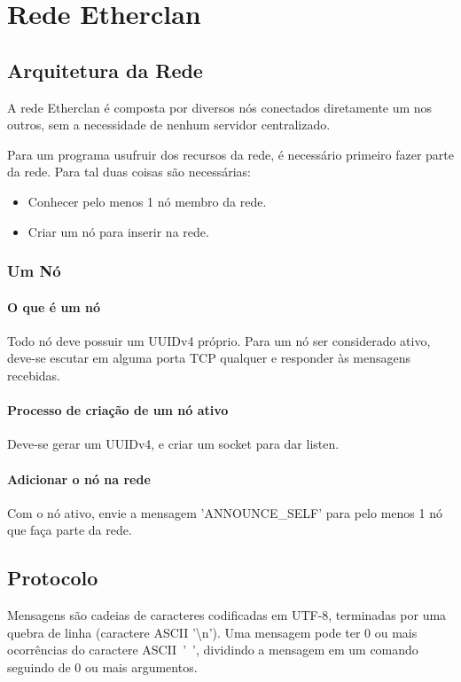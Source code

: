 \chapter{Rede Etherclan}
\label{sec:rede}

\section{Arquitetura da Rede}
\label{sec:rede:rede}

  A rede Etherclan é composta por diversos nós conectados diretamente um nos outros, sem a necessidade
  de nenhum servidor centralizado.
  
  Para um programa usufruir dos recursos da rede, é necessário primeiro fazer parte da rede. Para 
  tal duas coisas são necessárias:
  
  \begin{itemize}
    \item Conhecer pelo menos 1 nó membro da rede.
    \item Criar um nó para inserir na rede.
  \end{itemize}
  
  \subsection{Um Nó}
    \subsubsection{O que é um nó}
      Todo nó deve possuir um UUIDv4 próprio.
      Para um nó ser considerado ativo, deve-se escutar em alguma porta TCP qualquer e responder às
      mensagens recebidas.
      
    \subsubsection{Processo de criação de um nó ativo}
      Deve-se gerar um UUIDv4, e criar um socket para dar listen.

    \subsubsection{Adicionar o nó na rede}
      Com o nó ativo, envie a mensagem 'ANNOUNCE\_SELF' para pelo menos 1 nó que faça parte da rede.

\section{Protocolo}
  Mensagens são cadeias de caracteres codificadas em UTF-8, terminadas por uma quebra de linha
  (caractere ASCII '\textbackslash n'). Uma mensagem pode ter 0 ou mais ocorrências do caractere
  ASCII~'~', dividindo a mensagem em um comando seguindo de 0 ou mais argumentos.

